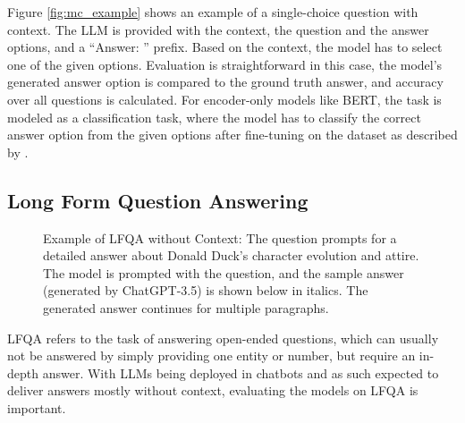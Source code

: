 Figure \ref{fig:mc_example} shows an example of a single-choice question with context.
The LLM is provided with the context, the question and the answer options, and a ``Answer: '' prefix.
Based on the context, the model has to select one of the given options.
Evaluation is straightforward in this case, the model's generated answer option is compared to the ground truth answer, and accuracy over all questions is calculated.
For encoder-only models like BERT, the task is modeled as a classification task, where the model has to classify the correct answer option from the given options after fine-tuning on the dataset as described by \cite{devlin:2018:BERT}.

\subsection{Long Form Question Answering}\label{sec:long-form-qa}
\begin{figure}[tb]
    \centering
    \caption{Example of LFQA without Context: The question prompts for a detailed answer about Donald Duck's character evolution and attire. The model is prompted with the question, and the sample answer (generated by ChatGPT-3.5) is shown below in italics. The generated answer continues for multiple paragraphs.}
    \label{fig:long_form_qa_example_with_answer}
\end{figure}
LFQA refers to the task of answering open-ended questions, which can usually not be answered by simply providing one entity or number, but require an in-depth answer.
With LLMs being deployed in chatbots and as such expected to deliver answers mostly without context, evaluating the models on LFQA is important.

